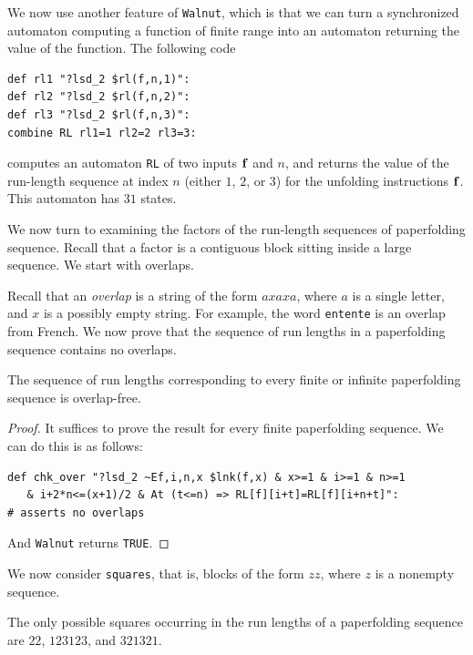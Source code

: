 \documentclass[12pt,reqno]{article}
\begin{document}
We now use another feature of {\tt Walnut}, which is that we can turn
a synchronized automaton 
computing a function of finite range into an automaton 
returning the value of the function. 
The following code
\begin{verbatim}
def rl1 "?lsd_2 $rl(f,n,1)":
def rl2 "?lsd_2 $rl(f,n,2)":
def rl3 "?lsd_2 $rl(f,n,3)":
combine RL rl1=1 rl2=2 rl3=3:
\end{verbatim}
computes an automaton {\tt RL} of two inputs $\bf f$ and $n$, and
returns the value of the run-length sequence at index $n$
(either $1$, $2$, or $3$) for the unfolding instructions
$\bf f$.  This automaton has $31$ states.

We now turn to examining the factors of the run-length sequences of
paperfolding sequence.  Recall that a factor is a contiguous block
sitting inside a large sequence.  We start with overlaps.

Recall that an {\it overlap} is a string of the form $axaxa$, where $a$ is
a single letter, and $x$ is a possibly empty string.  For example,
the word {\tt entente} is an overlap from French. We now prove that the
sequence of run lengths in a paperfolding sequence contains no
overlaps.  

\begin{theorem}
The sequence of run lengths corresponding to every
finite or infinite paperfolding sequence is overlap-free.
\end{theorem}

\begin{proof}
It suffices to prove the result for every finite paperfolding sequence.
We can do this is as follows:
\begin{verbatim}
def chk_over "?lsd_2 ~Ef,i,n,x $lnk(f,x) & x>=1 & i>=1 & n>=1
   & i+2*n<=(x+1)/2 & At (t<=n) => RL[f][i+t]=RL[f][i+n+t]":
# asserts no overlaps
\end{verbatim}
And {\tt Walnut} returns {\tt TRUE}.
\end{proof}

We now consider {\tt squares}, that is, blocks of the form
$zz$, where $z$ is a nonempty sequence.
\begin{theorem}
The only possible squares occurring in the run lengths of a
paperfolding sequence
are $22$, $123123$, and $321321$.
\end{theorem}
\end{document}
